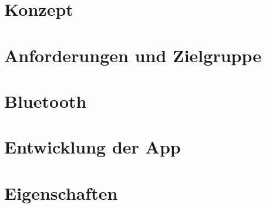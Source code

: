 \documentclass[a4paper, 12pt]{article} %
\begin{document}
\begin{spacing}{1.8}  %
\fontsize{14pt}{15pt}\selectfont  %


\end{spacing}

\clearpage

\section{Konzept}


\begin{spacing}{1.8}  %
\fontsize{14pt}{15pt}\selectfont  %


\end{spacing}

\clearpage

\section{Anforderungen und Zielgruppe}


\begin{spacing}{1.8}  %
\fontsize{14pt}{15pt}\selectfont  %


\end{spacing}

\clearpage

\section{Bluetooth}


\begin{spacing}{1.8}  %
\fontsize{14pt}{15pt}\selectfont  %


\end{spacing}

\clearpage

\section{Entwicklung der App}


\begin{spacing}{1.8}  %
\fontsize{14pt}{15pt}\selectfont  %


\end{spacing}

\clearpage

\section{Eigenschaften}
\end{document}
